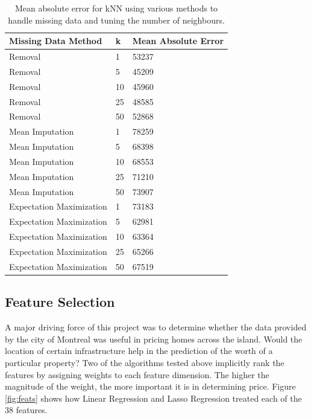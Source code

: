 \documentclass{acm_proc_article-sp}
\begin{document}
	\begin{center}
	\begin{table}	
    \begin{tabular}{| l | l | l |}
    \hline
    Missing Data Method & k & Mean Absolute Error \\ \hline
    \hline
	Removal & 1 & 53237 \\
	\hline
Removal & 5 & 45209\\
\hline
Removal & 10 & 45960\\
\hline
Removal & 25 & 48585\\
\hline
Removal & 50 & 52868\\
	\hline
    Mean Imputation & 1 & 78259\\
    \hline
Mean Imputation & 5& 68398\\
\hline
Mean Imputation & 10 &68553\\
\hline
Mean Imputation & 25 &71210\\
\hline
Mean Imputation & 50& 73907\\
    \hline
    Expectation Maximization & 1 & 73183\\
    \hline
Expectation Maximization & 5 &62981\\
\hline
Expectation Maximization & 10 &63364\\
\hline
Expectation Maximization & 25 &65266\\
\hline
Expectation Maximization & 50 &67519\\
    \hline
    \end{tabular}
    \caption{Mean absolute error for kNN using various methods to handle missing data and tuning the number of neighbours.}
    \label{fig:knnres}
    \end{table}
\end{center}
\subsection{Feature Selection}
	A major driving force of this project was to determine whether the data provided by the city of Montreal was useful in pricing homes across the island. Would the location of certain infrastructure help in the prediction of the worth of a particular property? Two of the algorithms tested above implicitly rank the features by assigning weights to each feature dimension. The higher the magnitude of the weight, the more important it is in determining price. Figure \ref{fig:feats} shows how Linear Regression and Lasso Regression treated each of the 38 features. 
	
\end{document}
